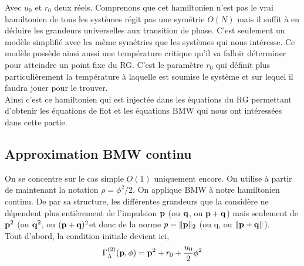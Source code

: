 \documentclass[10pt]{article}
\begin{document}
\begin{multicols}{2}
Avec $u_0$ et $r_0$ deux réels. Comprenons que cet hamiltonien n'est pas le vrai hamiltonien de tous les systèmes régit pas une symétrie $O(N)$ mais il suffit à en déduire les grandeurs universelles aux transition de phase. C'est seulement un modèle simplifié avec les même symétries que les systèmes qui nous intéresse. Ce modèle possède ainsi aussi une température critique qu'il va falloir déterminer pour atteindre un point fixe du RG. C'est le paramètre $r_0$ qui définit plus particulièrement la température à laquelle est soumise le système et sur lequel il faudra jouer pour le trouver.\\

Ainsi c'est ce hamiltonien qui est injectée dans les équations du RG permettant d'obtenir les équations de flot et les équations BMW qui nous ont intéressées dans cette partie.


\vspace*{11pt}

\subsection{Approximation BMW continu}


\vspace*{11pt}
On se concentre sur le cas simple $O(1)$ uniquement encore.
On utilise à partir de maintenant la notation $\rho = \phi^2/2$. On applique BMW à notre hamiltonien continu. De par sa structure, les différentes grandeurs que la considère ne dépendent plus entièrement de l'impulsion ${\bf p}$ (ou ${\bf q}$, ou ${\bf p}+{\bf q}$) mais seulement de ${\bf p}^2$ (ou ${\bf q}^2$, ou $({\bf p}+{\bf q})^2$et donc de la norme $p = \| {\bf p} \|_{2}$ (ou q, ou $\|{\bf p}+{\bf q}\|$). \\

Tout d'abord, la condition initiale  devient ici,
\begin{equation}
	\Gamma^{(2)}_\Lambda({\bf p}, \phi) = {\bf p}^2 + r_0 + \frac{u_0}{2} \phi^2
	\label{eq:initBMWCont}
\end{equation}


\end{multicols}
\end{document}
